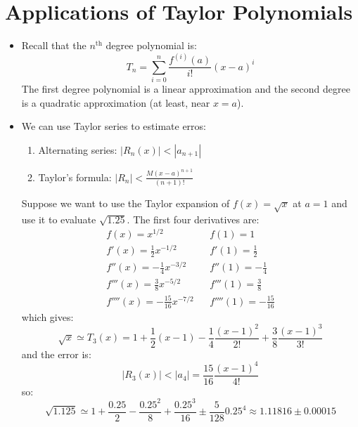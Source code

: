 \section{Applications of Taylor Polynomials}
\begin{itemize}
    \item Recall that the $n^\text{th}$ degree polynomial is:
    \begin{equation}
        T_n = \sum_{i=0}^n \frac{f^{(i)}(a)}{i!}(x-a)^i
    \end{equation}
    The first degree polynomial is a linear approximation and the second degree is a quadratic approximation (at least, near $x=a$).
    \item We can use Taylor series to estimate erros:
    \begin{enumerate}
        \item Alternating series: $|R_n(x)| < |a_{n+1}|$
        \item Taylor's formula: $|R_n| < \frac{M(x-a)^{n+1}}{(n+1)!}$
    \end{enumerate}
    \begin{example}
        Suppose we want to use the Taylor expansion of $f(x) = \sqrt{x}$ at $a=1$ and use it to evaluate $\sqrt{1.25}$. The first four derivatives are:
        \begin{align}
            f(x) = x^{1/2} && f(1) = 1\\ 
            f'(x)=\frac{1}{2}x^{-1/2} && f'(1)= \frac{1}{2} \\ 
            f''(x)=-\frac{1}{4}x^{-3/2} && f''(1) = -\frac{1}{4} \\ 
            f'''(x)=\frac{3}{8}x^{-5/2} && f'''(1) = \frac{3}{8} \\ 
            f''''(x)=-\frac{15}{16}x^{-7/2} && f''''(1) = -\frac{15}{16}
        \end{align}
        which gives:
        \begin{equation}
            \sqrt{x} \simeq T_3(x) = 1+ \frac{1}{2}(x-1) - \frac{1}{4} \frac{(x-1)^2}{2!} + \frac{3}{8}\frac{(x-1)^3}{3!}
        \end{equation}
        and the error is:
        \begin{equation}
            |R_3(x)| < |a_4| = \frac{15}{16}\frac{(x-1)^4}{4!}
        \end{equation}
        so:
        \begin{equation}
            \sqrt{1.125} \simeq 1 + \frac{0.25}{2} - \frac{0.25^2}{8} + \frac{0.25^3}{16} \pm \frac{5}{128}0.25^4 \approx 1.11816 \pm 0.00015

\end{equation}
\end{example}
\end{itemize}
